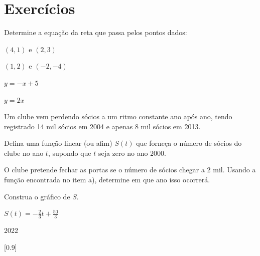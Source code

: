 \section{Exercícios}

\begin{exercises*}

\begin{exercise}
  Determine a equação da reta que passa pelos pontos dados:
  \begin{alphalist}
    \item $(4, 1)$ e $( 2,  3)$
    \item $(1, 2)$ e $(-2, -4)$
  \end{alphalist}

  \begin{answer}
    \begin{alphalist}
      \item $y=-x+5$
      \item $y=2x$
    \end{alphalist}
  \end{answer}
\end{exercise}

\begin{exercise}
  Um clube vem perdendo sócios a um ritmo constante ano após ano, tendo
  registrado 14 mil sócios em 2004 e apenas 8 mil sócios em 2013.
  \begin{alphalist}
    \item Defina uma função linear (ou afim) $S(t)$ que forneça o número
          de sócios do clube no ano $t$, supondo que $t$ seja zero no
          ano 2000.
    \item O clube pretende fechar as portas se o número de sócios chegar a
          2 mil. Usando a função encontrada no item a),
          determine em que ano isso ocorrerá.
    \item Construa o gráfico de $S$.
  \end{alphalist}

  \begin{answer}
    \begin{alphalist}
      \item \(S(t) = -\frac{2}{3}t + \frac{50}{3}\)
      \item 2022
      \item {}[0.9]
    \end{alphalist}
  \end{answer}
\end{exercise}


\end{exercises*}
